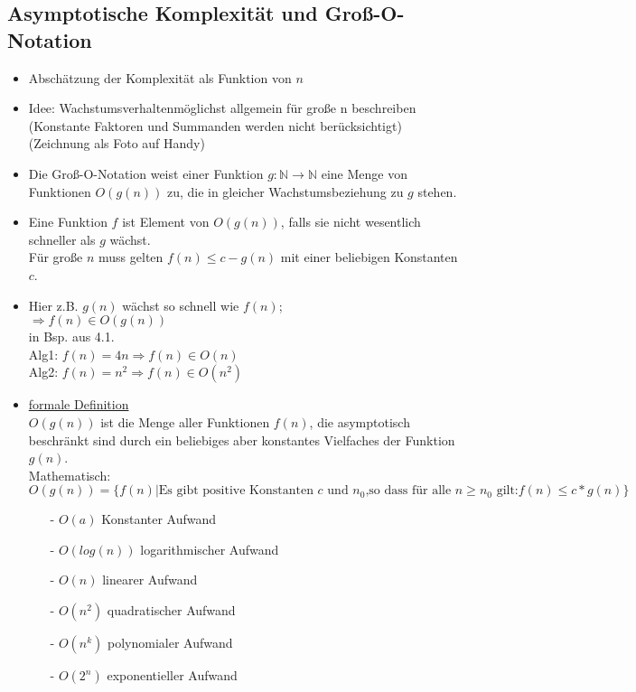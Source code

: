 \subsection{Asymptotische Komplexität und Groß-O-Notation}
\begin{itemize}
\item Abschätzung der Komplexität als Funktion von $n$
\item Idee: \grqq Wachstumsverhalten\glqq möglichst allgemein für große n beschreiben\\
(Konstante Faktoren und Summanden werden nicht berücksichtigt) \\
(Zeichnung als Foto auf Handy)
\item Die Groß-O-Notation weist einer Funktion $g: \mathbb{N} \rightarrow \mathbb{N}$ eine Menge von Funktionen $O(g(n))$ zu, die in gleicher Wachstumsbeziehung zu $g$ stehen.
\item Eine Funktion $f$ ist Element von $O(g(n))$, falls sie nicht wesentlich schneller als $g$ wächst. \\
Für große $n$ muss gelten $f(n) \leq c-g(n)$ mit einer beliebigen Konstanten $c$.
\item Hier z.B. $g(n)$ wächst so schnell wie $f(n)$; \\
$\Rightarrow f(n) \in O(g(n))$ \\
in Bsp. aus 4.1. \\
Alg1: $f(n) = 4n \Rightarrow f(n) \in O(n)$ \\
Alg2: $f(n) = n^2 \Rightarrow f(n) \in O(n^2)$ \\ 
\item \underline{formale Definition} \\
$O(g(n))$ ist die Menge aller Funktionen $f(n)$, die asymptotisch beschränkt sind durch ein beliebiges aber konstantes Vielfaches der Funktion $g(n)$. \\
Mathematisch: \\
$O(g(n)) = \{ f(n) | \mbox{Es gibt positive Konstanten } c \mbox{ und } n_0 \mbox{,so dass für alle } n \ge n_0 \mbox{ gilt:} f(n) \le c*g(n) \}$
\begin{itemize}
\item[-] $O(a)$ Konstanter Aufwand
\item[-] $O(log(n))$ logarithmischer Aufwand
\item[-] $O(n)$ linearer Aufwand
\item[-] $O(n^2)$ quadratischer Aufwand
\item[-] $O(n^k)$ polynomialer Aufwand
\item[-] $O(2^n)$ exponentieller Aufwand

\end{itemize}
\end{itemize}
